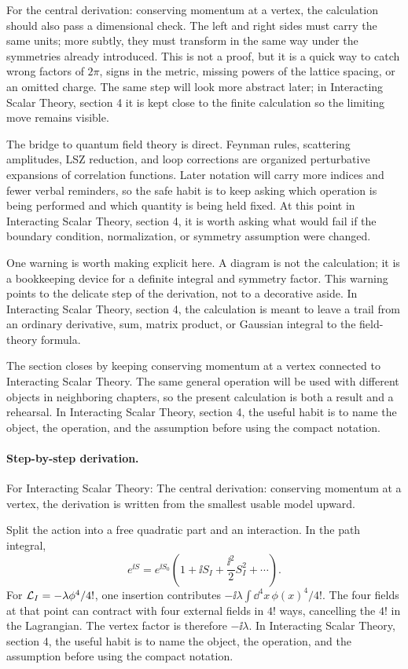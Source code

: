 For the central derivation: conserving momentum at a vertex, the calculation should also pass a dimensional check.  The left and right sides must carry the same units; more subtly, they must transform in the same way under the symmetries already introduced.  This is not a proof, but it is a quick way to catch wrong factors of \(2\pi\), signs in the metric, missing powers of the lattice spacing, or an omitted charge.  The same step will look more abstract later; in Interacting Scalar Theory, section 4 it is kept close to the finite calculation so the limiting move remains visible.

The bridge to quantum field theory is direct.  Feynman rules, scattering amplitudes, LSZ reduction, and loop corrections are organized perturbative expansions of correlation functions.  Later notation will carry more indices and fewer verbal reminders, so the safe habit is to keep asking which operation is being performed and which quantity is being held fixed.  At this point in Interacting Scalar Theory, section 4, it is worth asking what would fail if the boundary condition, normalization, or symmetry assumption were changed.

One warning is worth making explicit here.  A diagram is not the calculation; it is a bookkeeping device for a definite integral and symmetry factor.  This warning points to the delicate step of the derivation, not to a decorative aside.  In Interacting Scalar Theory, section 4, the calculation is meant to leave a trail from an ordinary derivative, sum, matrix product, or Gaussian integral to the field-theory formula.

The section closes by keeping conserving momentum at a vertex connected to Interacting Scalar Theory.  The same general operation will be used with different objects in neighboring chapters, so the present calculation is both a result and a rehearsal.  In Interacting Scalar Theory, section 4, the useful habit is to name the object, the operation, and the assumption before using the compact notation.



\paragraph{Step-by-step derivation.}

For Interacting Scalar Theory: The central derivation: conserving momentum at a vertex, the derivation is written from the smallest usable model upward.

Split the action into a free quadratic part and an interaction.  In the path integral,
\[
  e^{\ii S}=e^{\ii S_0}\left(1+\ii S_I+\frac{\ii^2}{2}S_I^2+\cdots\right).
\]
For \(\mathcal L_I=-\lambda\phi^4/4!\), one insertion contributes \(-\ii\lambda\int\dd^4x\,\phi(x)^4/4!\).  The four fields at that point can contract with four external fields in \(4!\) ways, cancelling the \(4!\) in the Lagrangian.  The vertex factor is therefore \(-\ii\lambda\).  In Interacting Scalar Theory, section 4, the useful habit is to name the object, the operation, and the assumption before using the compact notation.

